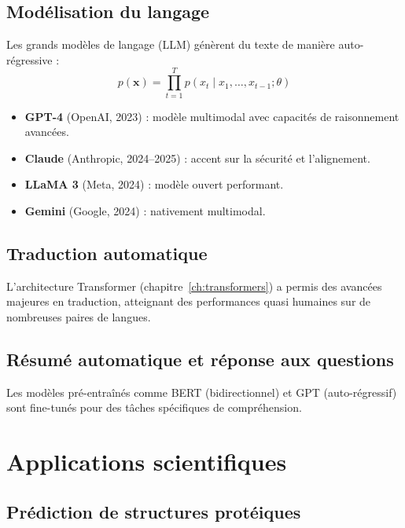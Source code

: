 \subsection{Mod\'elisation du langage}

Les grands mod\`eles de langage (LLM) g\'en\`erent du texte de mani\`ere auto-r\'egressive :
\[
p(\bm{x}) = \prod_{t=1}^T p(x_t \mid x_1, \ldots, x_{t-1}; \theta)
\]

\begin{sota}
\begin{itemize}
\item \textbf{GPT-4} (OpenAI, 2023) : mod\`ele multimodal avec capacit\'es de raisonnement avanc\'ees.
\item \textbf{Claude} (Anthropic, 2024--2025) : accent sur la s\'ecurit\'e et l'alignement.
\item \textbf{LLaMA 3} (Meta, 2024) : mod\`ele ouvert performant.
\item \textbf{Gemini} (Google, 2024) : nativement multimodal.
\end{itemize}
\end{sota}

\subsection{Traduction automatique}

L'architecture Transformer (chapitre~\ref{ch:transformers}) a permis des avanc\'ees majeures en traduction, atteignant des performances quasi humaines sur de nombreuses paires de langues.

\subsection{R\'esum\'e automatique et r\'eponse aux questions}

Les mod\`eles pr\'e-entra\^in\'es comme BERT (bidirectionnel) et GPT (auto-r\'egressif) sont fine-tun\'es pour des t\^aches sp\'ecifiques de compr\'ehension.

\section{Applications scientifiques}
\label{sec:app_science}

\subsection{Pr\'ediction de structures prot\'eiques}

